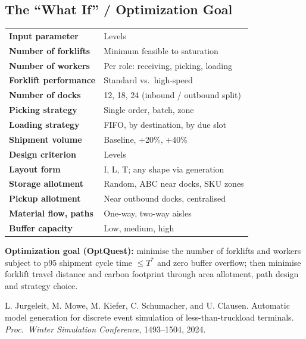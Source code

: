 \documentclass[10pt]{selfArx}
\begin{document}
\subsection*{The ``What If'' / Optimization Goal}
{\small
\renewcommand{\arraystretch}{1.12}
\setlength{\tabcolsep}{3pt}
\noindent\begin{tabularx}{\columnwidth}{>{\bfseries}P{2.9cm}L}
 Input parameter & Levels \\
Number of forklifts        & Minimum feasible to saturation \\
Number of workers          & Per role: receiving, picking, loading \\
Forklift performance       & Standard vs.\ high-speed \\
Number of docks            & 12, 18, 24 (inbound / outbound split) \\
Picking strategy           & Single order, batch, zone \\
Loading strategy           & FIFO, by destination, by due slot \\
Shipment volume            & Baseline, +20\%, +40\% \\
 Design criterion & Levels \\
Layout form                & I, L, T; any shape via generation \\
Storage allotment          & Random, ABC near docks, SKU zones \\
Pickup allotment           & Near outbound docks, centralised \\
Material flow, paths       & One-way, two-way aisles \\
Buffer capacity            & Low, medium, high \\
\end{tabularx}}

\vspace{4pt}
\noindent\colorbox{color2!10}{\parbox{\dimexpr\columnwidth-2\fboxsep\relax}{\small
\textbf{Optimization goal (OptQuest):} minimise the number of forklifts and workers subject to p95 shipment cycle time $\leq T^{*}$ and zero buffer overflow; then minimise forklift travel distance and carbon footprint through area allotment, path design and strategy choice.}}

\begin{thebibliography}{9}\small
{} L. Jurgeleit, M. Mowe, M. Kiefer, C. Schumacher, and U. Clausen. Automatic model generation for discrete event simulation of less-than-truckload terminals. \textit{Proc.\ Winter Simulation Conference}, 1493--1504, 2024.
\end{thebibliography}
\end{document}
